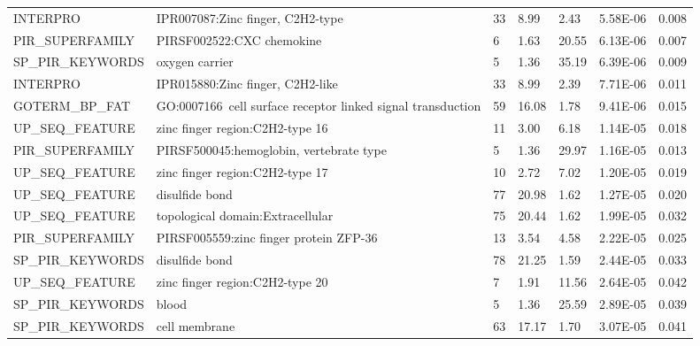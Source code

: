 \documentclass[a4paper,11pt,oneside]{book}
\begin{document}
{\begin{longtable}{lllllll}
INTERPRO          & IPR007087:Zinc finger, C2H2-type                                & 33    & 8.99  & 2.43            & 5.58E-06 & 0.008    \\
PIR\_SUPERFAMILY  & PIRSF002522:CXC chemokine                                       & 6     & 1.63  & 20.55           & 6.13E-06 & 0.007    \\
SP\_PIR\_KEYWORDS & oxygen carrier                                                  & 5     & 1.36  & 35.19           & 6.39E-06 & 0.009    \\
INTERPRO          & IPR015880:Zinc finger, C2H2-like                                & 33    & 8.99  & 2.39            & 7.71E-06 & 0.011    \\
GOTERM\_BP\_FAT   & GO:0007166~cell surface receptor linked signal transduction     & 59    & 16.08 & 1.78            & 9.41E-06 & 0.015    \\
UP\_SEQ\_FEATURE  & zinc finger region:C2H2-type 16                                 & 11    & 3.00  & 6.18            & 1.14E-05 & 0.018    \\
PIR\_SUPERFAMILY  & PIRSF500045:hemoglobin, vertebrate type                         & 5     & 1.36  & 29.97           & 1.16E-05 & 0.013    \\
UP\_SEQ\_FEATURE  & zinc finger region:C2H2-type 17                                 & 10    & 2.72  & 7.02            & 1.20E-05 & 0.019    \\
UP\_SEQ\_FEATURE  & disulfide bond                                                  & 77    & 20.98 & 1.62            & 1.27E-05 & 0.020    \\
UP\_SEQ\_FEATURE  & topological domain:Extracellular                                & 75    & 20.44 & 1.62            & 1.99E-05 & 0.032    \\
PIR\_SUPERFAMILY  & PIRSF005559:zinc finger protein ZFP-36                          & 13    & 3.54  & 4.58            & 2.22E-05 & 0.025    \\
SP\_PIR\_KEYWORDS & disulfide bond                                                  & 78    & 21.25 & 1.59            & 2.44E-05 & 0.033    \\
UP\_SEQ\_FEATURE  & zinc finger region:C2H2-type 20                                 & 7     & 1.91  & 11.56           & 2.64E-05 & 0.042    \\
SP\_PIR\_KEYWORDS & blood                                                           & 5     & 1.36  & 25.59           & 2.89E-05 & 0.039    \\
SP\_PIR\_KEYWORDS & cell membrane                                                   & 63    & 17.17 & 1.70            & 3.07E-05 & 0.041   

\end{longtable}
}
\end{document}

